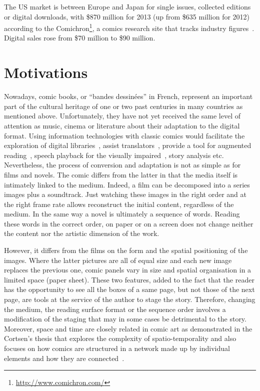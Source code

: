 The US market is between Europe and Japan for single issues, collected editions or digital downloads, with \$870 million for 2013 (up from \$635 million for 2012) according to the Comichron\footnote{\url{http://www.comichron.com/}}, a comics research site that tracks industry figures~\cite{Miller2014}.
Digital sales rose from \$70 million to \$90 million.

\section{Motivations} %
\label{sub:intro:motivations}

Nowadays, comic books, or ``bandes dessin{\'e}es'' in French, represent an important part of the cultural heritage of one or two past centuries in many countries as mentioned above.
Unfortunately, they have not yet received the same level of attention as music, cinema or literature about their adaptation to the digital format.
Using information technologies with classic comics would facilitate the exploration of digital libraries~\cite{Back2001}, assist translators~\cite{borodo2014multimodality}, provide a tool for augmented reading~\cite{Singh2004,Raulet2013Comics}, speech playback for the visually impaired~\cite{Brandon2014,Ponsard09}, story analysis etc.
Nevertheless, the process of conversion and adaptation is not as simple as for films and novels.
The comic differs from the latter in that the media itself is intimately linked to the medium.
Indeed, a film can be decomposed into a series images plus a soundtrack.
Just watching these images in the right order and at the right frame rate allows reconstruct the initial content, regardless of the medium. 
In the same way a novel is ultimately a sequence of words.
Reading these words in the correct order, on paper or on a screen does not change neither the content nor the artistic dimension of the work.

However, it differs from the films on the form and the spatial positioning of the images.
Where the latter pictures are all of equal size and each new image replaces the previous one, comic panels vary in size and spatial organisation in a limited space (paper sheet).
These two features, added to the fact that the reader has the opportunity to see all the boxes of a same page, but not those of the next page, are tools at the service of the author to stage the story.
Therefore, changing the medium, the reading surface format or the sequence order involves a modification of the staging that may in some cases be detrimental to the story.
Moreover, space and time are closely related in comic art as demonstrated in the Cortsen's thesis that explores the complexity of spatio-temporality and also focuses on how comics are structured in a network made up by individual elements and how they are connected~\cite{Cortsen2012Comics}.

